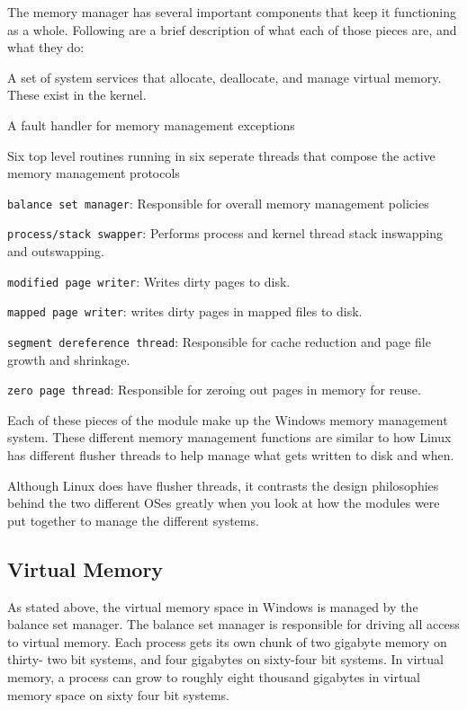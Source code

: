 \documentclass[10pt,letterpaper,onecolumn,draftclsnofoot]{IEEEtran}
\begin{document}
  The memory manager has several important components that keep it functioning as a
  whole. Following are a brief description of what each of those pieces are, and what
  they do: \cite{internals2}
  \begin{description}
	  \item A set of system services that allocate, deallocate, and manage virtual
		  memory. These exist in the kernel.
	  \item A fault handler for memory management exceptions
	  \item Six top level routines running in six seperate threads that compose
		  the active memory management protocols

		  \begin{description}
			  \item \texttt{balance set manager}: Responsible for overall
				  memory management policies
			  \item \texttt{process/stack swapper}: Performs process and
				  kernel thread stack inswapping and outswapping.
			  \item \texttt{modified page writer}: Writes dirty pages to
				  disk.
			  \item \texttt{mapped page writer}: writes dirty pages in 
				  mapped files to disk. 
			  \item \texttt{segment dereference thread}: Responsible for
				  cache reduction and page file growth and shrinkage.
			  \item \texttt{zero page thread}: Responsible for zeroing
				  out pages in memory for reuse.
		  \end{description}
  \end{description}
  Each of these pieces of the module make up the Windows memory management system.
  These different memory management functions are similar to how Linux has different
  flusher threads to help manage what gets written to disk and when.

  Although Linux does have flusher threads, it contrasts the design philosophies behind
  the two different OSes greatly when you look at how the modules were put together to
  manage the different systems. 

  \subsection{Virtual Memory}
	As stated above, the virtual memory space in Windows is managed by the balance
	set manager. The balance set manager is responsible for driving all access
	to virtual memory. Each process gets its own chunk of two gigabyte memory on thirty-
	two bit systems, and four gigabytes on sixty-four bit systems. In virtual memory,
	a process can grow to roughly eight thousand gigabytes in virtual memory space on
	sixty four bit systems.\cite{internals2}
\end{document}
